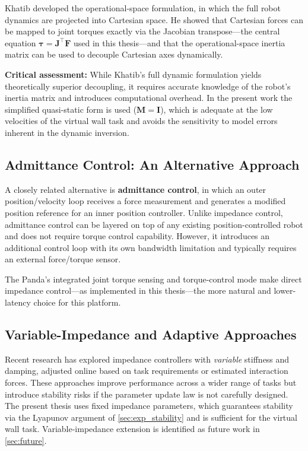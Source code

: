 Khatib \cite{Khatib1987} developed the operational-space formulation,
in which the full robot dynamics are projected into Cartesian space.
He showed that Cartesian forces can be mapped to joint torques exactly
via the Jacobian transpose---the central equation $\bm{\tau}=\mathbf{J}^\top\mathbf{F}$
used in this thesis---and that the operational-space inertia matrix
can be used to decouple Cartesian axes dynamically.

\textbf{Critical assessment:} While Khatib's full dynamic formulation
yields theoretically superior decoupling, it requires accurate knowledge
of the robot's inertia matrix and introduces computational overhead.
In the present work the simplified quasi-static form is used
($\mathbf{M}=\mathbf{I}$), which is adequate at the low velocities
of the virtual wall task and avoids the sensitivity to model errors
inherent in the dynamic inversion.

\subsection{Admittance Control: An Alternative Approach}

A closely related alternative is \textbf{admittance control}, in which
an outer position/velocity loop receives a force measurement and
generates a modified position reference for an inner position
controller.
Unlike impedance control, admittance control can be layered on top of
any existing position-controlled robot and does not require torque
control capability.
However, it introduces an additional control loop with its own bandwidth
limitation and typically requires an external force/torque sensor.

The Panda's integrated joint torque sensing and  torque-control mode
make direct impedance control---as implemented in this thesis---the
more natural and lower-latency choice for this platform.

\subsection{Variable-Impedance and Adaptive Approaches}

Recent research has explored impedance controllers with
\emph{variable} stiffness and damping, adjusted online based on
task requirements or estimated interaction forces.
These approaches improve performance across a wider range of tasks
but introduce stability risks if the parameter update law is not
carefully designed.
The present thesis uses fixed impedance parameters, which guarantees
stability via the Lyapunov argument of \cref{sec:exp_stability} and
is sufficient for the virtual wall task.
Variable-impedance extension is identified as future work in
\cref{sec:future}.


